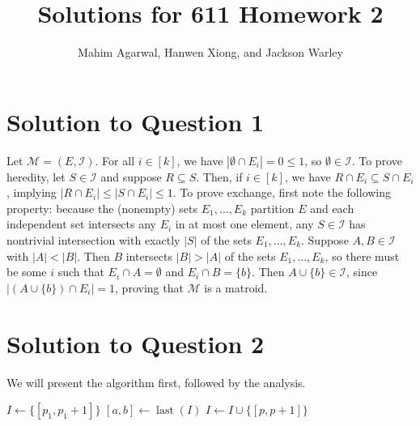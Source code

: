 \documentclass[11pt]{article}
\title{Solutions for 611 Homework 2}
\author{Mahim Agarwal, Hanwen Xiong, and Jackson Warley}
\newcommand{\M}{\mathcal{M}}
\newcommand{\I}{\mathcal{I}}
\begin{document}
\maketitle

\section{Solution to Question 1}

Let $\M = (E, \I)$. For all $i \in [k]$, we have $|\emptyset \cap E_i| = 0 \leq 1$, so $\emptyset \in \I$.
To prove heredity, let $S \in \I$ and suppose $R \subseteq S$.
Then, if $i \in [k]$, we have $R \cap E_i \subseteq S \cap E_i$, implying $|R \cap E_i| \leq |S \cap E_i| \leq 1$.
To prove exchange, first note the following property: because the (nonempty) sets $E_1, \dots, E_k$ partition $E$ and each independent set intersects any $E_i$ in at most one element, any $S \in \I$ has nontrivial intersection with exactly $|S|$ of the sets $E_1, \dots, E_k$.
Suppose $A, B \in \I$ with $|A| < |B|$.
Then $B$ intersects $|B| > |A|$ of the sets $E_1, \dots, E_k$, so there must be some $i$ such that $E_i \cap A = \emptyset$ and $E_i \cap B = \{b\}$.
Then $A \cup \{b\} \in \I$, since $|(A \cup \{b\}) \cap E_i| = 1$, proving that $\M$ is a matroid.

\section{Solution to Question 2}

We will present the algorithm first, followed by the analysis.
\begin{algorithm}
\begin{algorithmic}
    \State $I \gets \{[p_1, p_1 + 1]\}$
      \State $[a, b] \gets \operatorname{last}(I)$
      \State $I \gets I \cup \{[p, p + 1]\}$
      \EndIf
    \EndFor
  \EndFunction
\end{algorithmic}
\end{algorithm}
\end{document}
